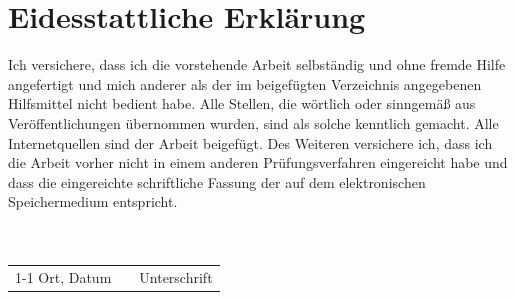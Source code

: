 \newpage
\thispagestyle{empty}
\section*{Eidesstattliche Erklärung}
Ich versichere, dass ich die vorstehende Arbeit selbständig und ohne fremde Hilfe angefertigt und mich anderer als der im beigefügten Verzeichnis angegebenen Hilfsmittel nicht bedient habe. Alle Stellen, die wörtlich oder sinngemäß aus Veröffentlichungen übernommen wurden, sind als solche kenntlich gemacht. Alle Internetquellen sind der Arbeit beigefügt. Des Weiteren versichere ich, dass ich die Arbeit vorher nicht in einem anderen Prüfungsverfahren eingereicht habe und dass die eingereichte schriftliche Fassung der auf dem elektronischen Speichermedium entspricht.
\\ \\ \\
\begin{tabular}{lp{3em}l}
	\hspace{5cm}   && \hspace{4cm} \\\cline{1-1}\cline{3-3}
	Ort, Datum     && Unterschrift
\end{tabular}


